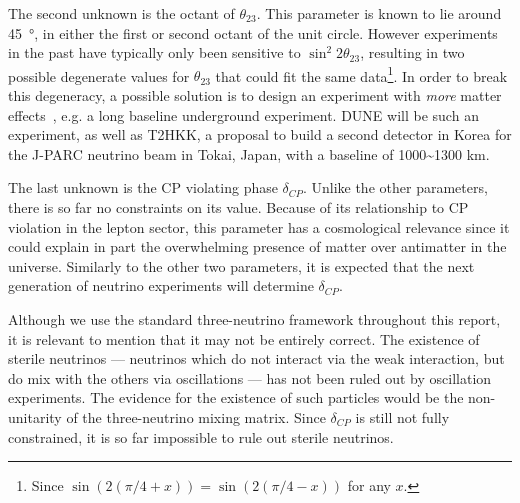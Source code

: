 The second unknown is the octant of $\theta_{23}$. This parameter is known to
lie around \SI{45}{\degree}, in either the first or second octant of the unit
circle. However experiments in the past have typically only been
sensitive to $\sin^2{2 \theta_{23}}$, resulting in two possible degenerate
values for $\theta_{23}$ that could fit the same data\footnote{Since
$\sin(2(\pi/4+x)) = \sin(2(\pi/4-x))$ for any $x$.}\cite{novat23}.
In order to break this degeneracy, a possible solution is to design an
experiment with \emph{more} matter effects~\cite{raut}, e.g. a long baseline
underground experiment. DUNE will be such an experiment, as well as
T2HKK, a proposal to build a second detector in Korea for the J-PARC neutrino
beam in Tokai, Japan, with a baseline of 1000\textasciitilde1300 km\cite{t2hkk}.

The last unknown is the CP violating phase $\delta_{CP}$. Unlike the other
parameters, there is so far no constraints on its value.
Because of its relationship to CP violation in the lepton sector, this
parameter has a cosmological relevance since it could explain in part the
overwhelming presence of matter over antimatter in the universe. Similarly to
the other two parameters, it is expected that the next generation of neutrino
experiments will determine $\delta_{CP}$.

Although we use the standard three-neutrino framework throughout this report,
it is relevant to mention that it may not be entirely correct. The existence of
sterile neutrinos --- neutrinos which do not interact via the weak interaction,
but do mix with the others via oscillations --- has not been ruled out by
oscillation experiments. The evidence for the existence of such particles would
be the non-unitarity of the three-neutrino mixing matrix. Since
$\delta_{CP}$ is still not fully constrained, it is so far impossible to rule out
sterile neutrinos.
